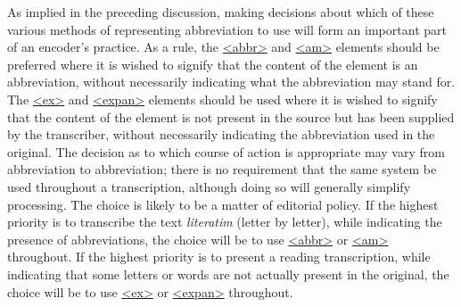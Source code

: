 As implied in the preceding discussion, making decisions about which of these various methods of representing abbreviation to use will form an important part of an encoder's practice. As a rule, the \hyperref[TEI.abbr]{<abbr>} and \hyperref[TEI.am]{<am>} elements should be preferred where it is wished to signify that the content of the element is an abbreviation, without necessarily indicating what the abbreviation may stand for. The \hyperref[TEI.ex]{<ex>} and \hyperref[TEI.expan]{<expan>} elements should be used where it is wished to signify that the content of the element is not present in the source but has been supplied by the transcriber, without necessarily indicating the abbreviation used in the original. The decision as to which course of action is appropriate may vary from abbreviation to abbreviation; there is no requirement that the same system be used throughout a transcription, although doing so will generally simplify processing. The choice is likely to be a matter of editorial policy. If the highest priority is to transcribe the text \textit{literatim} (letter by letter), while indicating the presence of abbreviations, the choice will be to use \hyperref[TEI.abbr]{<abbr>} or \hyperref[TEI.am]{<am>} throughout. If the highest priority is to present a reading transcription, while indicating that some letters or words are not actually present in the original, the choice will be to use \hyperref[TEI.ex]{<ex>} or \hyperref[TEI.expan]{<expan>} throughout.\par
